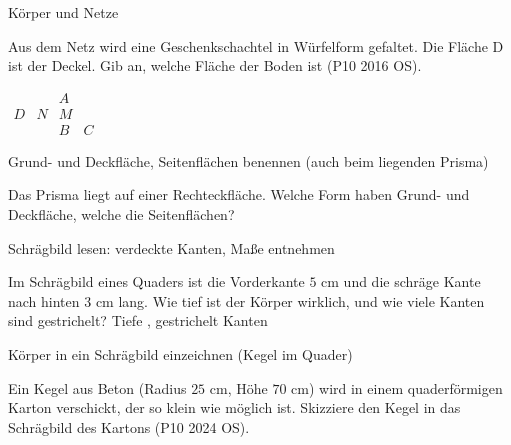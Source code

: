 \begin{aufgabe}{Körper und Netze}
\begin{teile}
\teil Aus dem Netz wird eine Geschenkschachtel in Würfelform gefaltet. Die Fläche D ist der Deckel. Gib an, welche Fläche der Boden ist \hfill (P10 2016 OS).

$\begin{array}{cccc}  &  & A &  \\ D & N & M &  \\  &  & B & C \end{array}$
\leerfeld
\end{teile}
\end{aufgabe}

\begin{aufgabe}{Grund- und Deckfläche, Seitenflächen benennen (auch beim liegenden Prisma)}
\begin{teile}
\teil Das Prisma liegt auf einer Rechteckfläche. Welche Form haben Grund- und Deckfläche, welche die Seitenflächen?

\end{teile}
\end{aufgabe}

\begin{aufgabe}{Schrägbild lesen: verdeckte Kanten, Maße entnehmen}
\begin{teile}
\teil Im Schrägbild eines Quaders ist die Vorderkante $5$ cm und die schräge Kante nach hinten $3$ cm lang. Wie tief ist der Körper wirklich, und wie viele Kanten sind gestrichelt? Tiefe \leerfeld[cm] , gestrichelt \leerfeld Kanten
\end{teile}
\end{aufgabe}

\begin{aufgabe}{Körper in ein Schrägbild einzeichnen (Kegel im Quader)}
\begin{teile}
\teil Ein Kegel aus Beton (Radius $25$ cm, Höhe $70$ cm) wird in einem quaderförmigen Karton verschickt, der so klein wie möglich ist. Skizziere den Kegel in das Schrägbild des Kartons \hfill (P10 2024 OS).

\end{teile}
\end{aufgabe}

